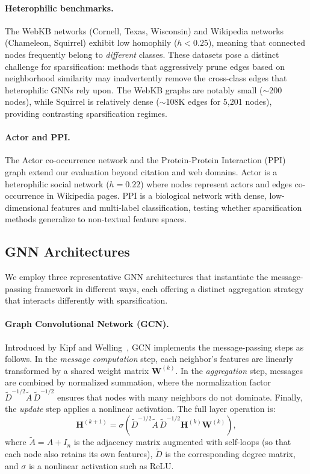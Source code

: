 \documentclass[conference]{IEEEtran}
\begin{document}
\paragraph{Heterophilic benchmarks.} The WebKB networks (Cornell, Texas, Wisconsin) and Wikipedia networks (Chameleon, Squirrel) exhibit low homophily ($h < 0.25$), meaning that connected nodes frequently belong to \emph{different} classes. These datasets pose a distinct challenge for sparsification: methods that aggressively prune edges based on neighborhood similarity may inadvertently remove the cross-class edges that heterophilic GNNs rely upon. The WebKB graphs are notably small (${\sim}$200 nodes), while Squirrel is relatively dense (${\sim}$108K edges for 5{,}201 nodes), providing contrasting sparsification regimes.

\paragraph{Actor and PPI.} The Actor co-occurrence network and the Protein-Protein Interaction (PPI) graph extend our evaluation beyond citation and web domains. Actor is a heterophilic social network ($h = 0.22$) where nodes represent actors and edges co-occurrence in Wikipedia pages. PPI is a biological network with dense, low-dimensional features and multi-label classification, testing whether sparsification methods generalize to non-textual feature spaces.

\subsection{GNN Architectures}\label{sec:gnn_architectures}

We employ three representative GNN architectures that instantiate the message-passing framework in different ways, each offering a distinct aggregation strategy that interacts differently with sparsification.

\paragraph{Graph Convolutional Network (GCN).} Introduced by Kipf and Welling~\cite{kipf2017}, GCN implements the message-passing steps as follows. In the \emph{message computation} step, each neighbor's features are linearly transformed by a shared weight matrix $\mathbf{W}^{(k)}$. In the \emph{aggregation} step, messages are combined by normalized summation, where the normalization factor $\tilde{D}^{-1/2} \tilde{A} \, \tilde{D}^{-1/2}$ ensures that nodes with many neighbors do not dominate. Finally, the \emph{update} step applies a nonlinear activation. The full layer operation is:
\begin{equation}
    \mathbf{H}^{(k+1)} = \sigma\!\left(\tilde{D}^{-1/2} \tilde{A} \, \tilde{D}^{-1/2} \mathbf{H}^{(k)} \mathbf{W}^{(k)}\right),
    \label{eq:gcn}
\end{equation}
where $\tilde{A} = A + I_n$ is the adjacency matrix augmented with self-loops (so that each node also retains its own features), $\tilde{D}$ is the corresponding degree matrix, and $\sigma$ is a nonlinear activation such as ReLU.
\end{document}
